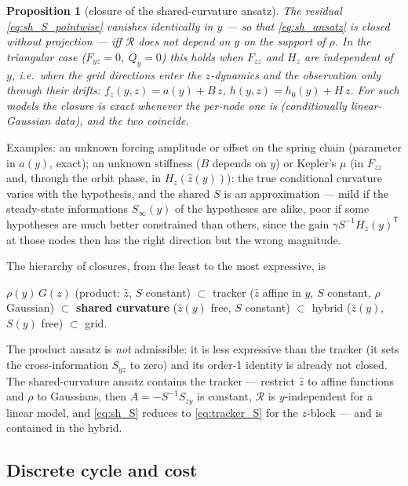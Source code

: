 \documentclass[11pt,a4paper]{article}
\newcommand{\T}{^{\mathsf T}}
\newcommand{\zh}{\hat{z}}
\theoremstyle{plain}
\newtheorem{proposition}{Proposition}
\theoremstyle{definition}
\theoremstyle{remark}
\begin{document}
\begin{proposition}[closure of the shared-curvature ansatz]
The residual \eqref{eq:sh_S_pointwise} vanishes identically in $y$ --- so that \eqref{eq:sh_ansatz} is closed without projection --- iff $\mathcal R$ does not depend on $y$ on the support of $\rho$. In the triangular case ($F_{yz}=0$, $Q_y=0$) this holds when $F_{zz}$ and $H_z$ are independent of $y$, i.e.\ when the grid directions enter the $z$-dynamics and the observation only through their drifts: $f_z(y,z) = a(y)+B\,z$, $h(y,z) = h_0(y)+H\,z$. For such models the closure is exact whenever the per-node one is (conditionally linear-Gaussian data), and the two coincide.
\end{proposition}
Examples: an unknown forcing amplitude or offset on the spring chain (parameter in $a(y)$, exact); an unknown stiffness ($B$ depends on $y$) or Kepler's $\mu$ (in $F_{zz}$ and, through the orbit phase, in $H_z(\zh(y))$): the true conditional curvature varies with the hypothesis, and the shared $S$ is an approximation --- mild if the steady-state informations $S_\infty(y)$ of the hypotheses are alike, poor if some hypotheses are much better constrained than others, since the gain $\gamma S^{-1}H_z(y)\T$ at those nodes then has the right direction but the wrong magnitude.

The hierarchy of closures, from the least to the most expressive, is
\begin{center}
$\rho(y)\,G(z)$ (product: $\zh$, $S$ constant)
\;$\subset$\; tracker ($\zh$ affine in $y$, $S$ constant, $\rho$ Gaussian)
\;$\subset$\; \textbf{shared curvature} ($\zh(y)$ free, $S$ constant)
\;$\subset$\; hybrid ($\zh(y)$, $S(y)$ free)
\;$\subset$\; grid.
\end{center}
The product ansatz is \emph{not} admissible: it is less expressive than the tracker (it sets the cross-information $S_{yz}$ to zero) and its order-1 identity is already not closed. The shared-curvature ansatz contains the tracker --- restrict $\zh$ to affine functions and $\rho$ to Gaussians, then $A=-S^{-1}S_{zy}$ is constant, $\mathcal R$ is $y$-independent for a linear model, and \eqref{eq:sh_S} reduces to \eqref{eq:tracker_S} for the $z$-block --- and is contained in the hybrid.

\subsection{Discrete cycle and cost}
\end{document}
